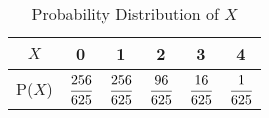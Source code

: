\documentclass[journal,12pt,twocolumn]{IEEEtran}
\newcommand\T{\rule{0pt}{2.6ex}}       %
\begin{document}
\begin{enumerate}[label=13.\arabic{enumi}.\arabic{enumii}]
	\begin{table}[h!]
	\normalsize
	\centering
			\begin{tabular}[20pt]{|>{}c|a|a|a|a|a|} \hline
			$X$&0&1&2&3&4 \T \\ \hline
			P($X$)&$\cfrac{256}{625}$&$\cfrac{256}{625}$&$\cfrac{96}{625}$&$\cfrac{16}{625}$&$\cfrac{1}{625}$\\[1.5ex] \hline
		\end{tabular}\\[2ex]
		\caption{Probability Distribution of $X$}
	\end{table}\\
\end{enumerate}
\end{document}
